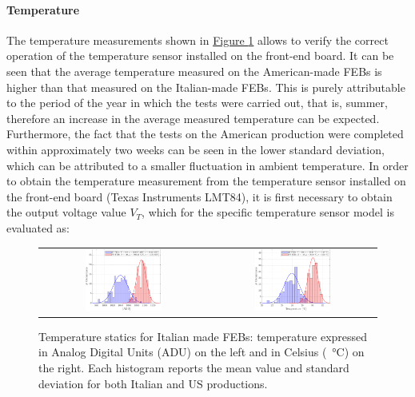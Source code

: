 \paragraph{Temperature} The temperature measurements shown in \hyperref[figFEBtemp]{Figure \ref{figFEBtemp}} allows to verify the correct operation of the temperature sensor installed on the front-end board. It can be seen that the average temperature measured on the American-made FEBs is higher than that measured on the Italian-made FEBs. This is purely attributable to the period of the year in which the tests were carried out, that is, summer, therefore an increase in the average measured temperature can be expected. Furthermore, the fact that the tests on the American production were completed within approximately two weeks can be seen in the lower standard deviation, which can be attributed to a smaller fluctuation in ambient temperature. In order to obtain the temperature measurement from the temperature sensor installed on the front-end board (Texas Instruments LMT84), it is first necessary to obtain the output voltage value $V_{T}$, which for the specific temperature sensor model is evaluated as:

\begin{figure}[h!]
    \centering
    \begin{tabular}{cc}
        \includegraphics[width=0.475\textwidth]{Images/chap2/results/temperatura_ADC.pdf} & \includegraphics[width=0.475\textwidth]{Images/chap2/results/temperatura_C.pdf}\\
    \end{tabular}
    \caption{Temperature statics for Italian made FEBs: temperature expressed in Analog Digital Units (ADU) on the left and in Celsius (\SI{}{\celsius}) on the right. Each histogram reports the mean value and standard deviation for both Italian and US productions.}
    \label{figFEBtemp}
\end{figure}

